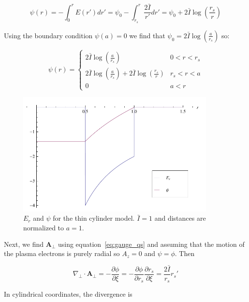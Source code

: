\documentclass[aps,prl,preprint,groupedaddress]{revtex4-1}
\begin{document}
\begin{equation}\label{eq:thin_psi}
\psi(r) = -\int_0^r E(r') dr' = \psi_0 - \int_{r_s}^r \frac{2\bar{I}}{r'}dr' = \psi_0 + 2\bar{I} \log\left(\frac{r_s}{r}\right)
\end{equation}

Using the boundary condition $\psi(a) = 0$ we find that $\psi_0 = 2\bar{I} \log\left(\frac{a}{r_s}\right)$ so:

\begin{equation}\label{eq:psi_everywhere}
\psi(r) = \left\{ \begin{array}{lr}
2\bar{I} \log\left(\frac{a}{r_s}\right) & 0<r<r_s \\
2\bar{I} \log\left(\frac{a}{r_s}\right) + 2\bar{I} \log\left(\frac{r_s}{r}\right) & r_s<r<a \\
0 & a<r
\end{array} \right.
\end{equation}

\begin{figure}[ht]\label{fig:fields}
  \centering
    \includegraphics[width=100mm]{./figures/fields.pdf}
      \caption{$E_r$ and $\psi$ for the thin cylinder model. $\bar{I} = 1$ and distances are normalized to $a=1$.}
\end{figure}

Next, we find $\mathbf{A}_{\perp}$ using equation~\ref{eq:gauge_qs} and assuming that the motion of the plasma electrons is purely radial so $A_z = 0$ and $\psi = \phi$. Then

\begin{equation}\label{eq:a_perp}
\nabla_\perp \cdot \mathbf{A}_\perp = -\frac{\partial \phi}{\partial \xi} = - \frac{\partial \phi}{\partial r_s}\frac{\partial r_s}{\partial \xi} = \frac{2\bar{I}}{r_s}r_s'
\end{equation}

In cylindrical coordinates, the divergence is
\end{document}
